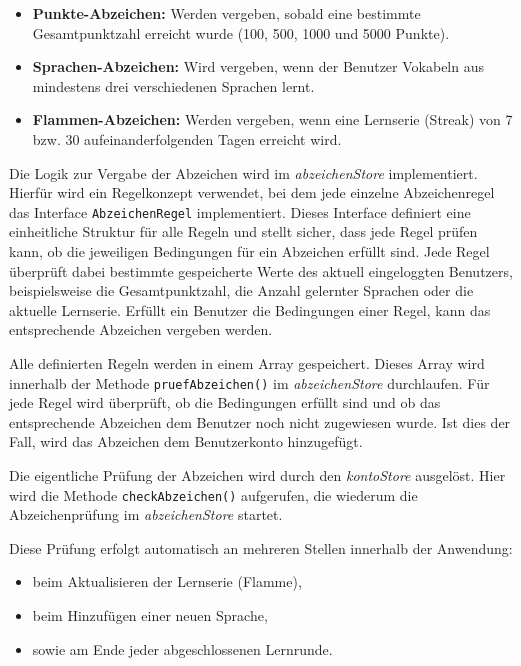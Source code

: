 \begin{itemize}
    \item \textbf{Punkte-Abzeichen:} Werden vergeben, sobald eine bestimmte Gesamtpunktzahl erreicht wurde (100, 500, 1000 und 5000 Punkte).
    \item \textbf{Sprachen-Abzeichen:} Wird vergeben, wenn der Benutzer Vokabeln aus mindestens drei verschiedenen Sprachen lernt.
    \item \textbf{Flammen-Abzeichen:} Werden vergeben, wenn eine Lernserie (Streak) von 7 bzw. 30 aufeinanderfolgenden Tagen erreicht wird.
\end{itemize}

Die Logik zur Vergabe der Abzeichen wird im \textit{abzeichenStore} implementiert. 
Hierfür wird ein Regelkonzept verwendet, bei dem jede einzelne Abzeichenregel das Interface \texttt{AbzeichenRegel} implementiert. 
Dieses Interface definiert eine einheitliche Struktur für alle Regeln und stellt sicher, dass jede Regel prüfen kann, ob die jeweiligen Bedingungen für ein Abzeichen erfüllt sind.
Jede Regel überprüft dabei bestimmte gespeicherte Werte des aktuell eingeloggten Benutzers, beispielsweise die Gesamtpunktzahl, die Anzahl gelernter Sprachen oder die aktuelle Lernserie. 
Erfüllt ein Benutzer die Bedingungen einer Regel, kann das entsprechende Abzeichen vergeben werden.

Alle definierten Regeln werden in einem Array gespeichert. 
Dieses Array wird innerhalb der Methode \texttt{pruefAbzeichen()} im \textit{abzeichenStore} durchlaufen. 
Für jede Regel wird überprüft, ob die Bedingungen erfüllt sind und ob das entsprechende Abzeichen dem Benutzer noch nicht zugewiesen wurde. 
Ist dies der Fall, wird das Abzeichen dem Benutzerkonto hinzugefügt.

Die eigentliche Prüfung der Abzeichen wird durch den \textit{kontoStore} ausgelöst. 
Hier wird die Methode \texttt{checkAbzeichen()} aufgerufen, die wiederum die Abzeichenprüfung im \textit{abzeichenStore} startet.

Diese Prüfung erfolgt automatisch an mehreren Stellen innerhalb der Anwendung:

\begin{itemize}
    \item beim Aktualisieren der Lernserie (Flamme),
    \item beim Hinzufügen einer neuen Sprache,
    \item sowie am Ende jeder abgeschlossenen Lernrunde.
\end{itemize}

